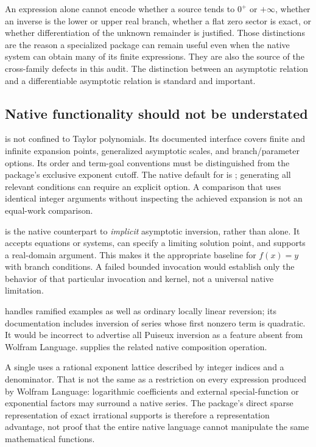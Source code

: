 An expression alone cannot encode whether a source tends to $0^+$ or $+\infty$, whether an inverse is the lower or upper real branch, whether a flat zero sector is exact, or whether differentiation of the unknown remainder is justified. Those distinctions are the reason a specialized package can remain useful even when the native system can obtain many of its finite expressions. They are also the source of the cross-family defects in this audit. The distinction between an asymptotic relation and a differentiable asymptotic relation is standard and important.\cite{dlmf21}

\subsection{Native functionality should not be understated}

 is not confined to Taylor polynomials. Its documented interface covers finite and infinite expansion points, generalized asymptotic scales, and branch/parameter options. Its order and term-goal conventions must be distinguished from the package's exclusive exponent cutoff. The native default for  is ; generating all relevant conditions can require an explicit option. A comparison that uses identical integer arguments without inspecting the achieved expansion is not an equal-work comparison.\cite{wl-asymptotic}

 is the native counterpart to \emph{implicit} asymptotic inversion, rather than  alone. It accepts equations or systems, can specify a limiting solution point, and supports a real-domain argument. This makes it the appropriate baseline for $f(x)=y$ with branch conditions. A failed bounded invocation would establish only the behavior of that particular invocation and kernel, not a universal native limitation.\cite{wl-asolve}

 handles ramified examples as well as ordinary locally linear reversion; its documentation includes inversion of series whose first nonzero term is quadratic. It would be incorrect to advertise all Puiseux inversion as a feature absent from Wolfram Language.  supplies the related native composition operation.\cite{wl-inverse,wl-compose}

A single  uses a rational exponent lattice described by integer indices and a denominator. That is not the same as a restriction on every expression produced by Wolfram Language: logarithmic coefficients and external special-function or exponential factors may surround a native series. The package's direct sparse representation of exact irrational supports is therefore a representation advantage, not proof that the entire native language cannot manipulate the same mathematical functions.\cite{wl-seriesdata,wl-series}

